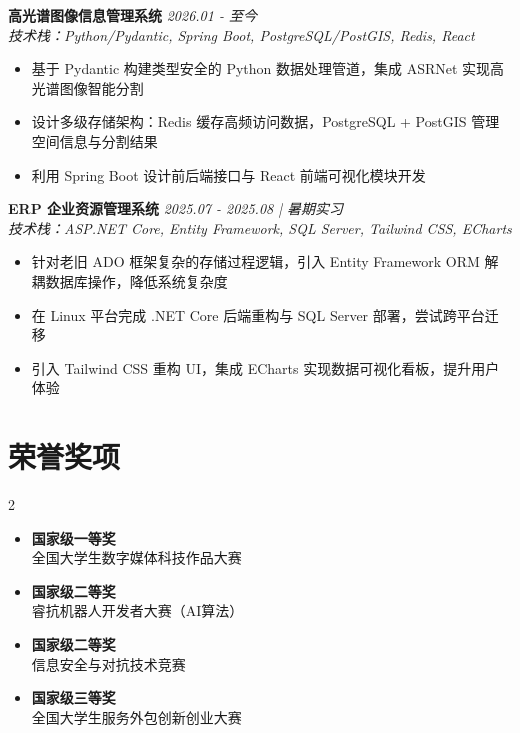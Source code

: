 \documentclass[11pt,a4paper]{article}
\newcommand{\resumeItem}[1]{\item\small{#1}}
\newcommand{\techstack}[1]{\textit{\small{\textcolor{secondary}{技术栈：#1}}}}
\newcommand{\projectdate}[1]{\hfill\textit{\small{\textcolor{secondary}{#1}}}}
\begin{document}
	\vspace{6pt}
	
	\textbf{高光谱图像信息管理系统} \projectdate{2026.01 - 至今} \\
	\techstack{Python/Pydantic, Spring Boot, PostgreSQL/PostGIS, Redis, React}
	\begin{itemize}[leftmargin=15pt, itemsep=2pt, topsep=4pt]
		\resumeItem{基于 Pydantic 构建类型安全的 Python 数据处理管道，集成 ASRNet 实现高光谱图像智能分割}
		\resumeItem{设计多级存储架构：Redis 缓存高频访问数据，PostgreSQL + PostGIS 管理空间信息与分割结果}
		\resumeItem{利用 Spring Boot 设计前后端接口与 React 前端可视化模块开发}
	\end{itemize}
	
	\vspace{6pt}
	
	\textbf{ERP 企业资源管理系统} \projectdate{2025.07 - 2025.08 | 暑期实习} \\
	\techstack{ASP.NET Core, Entity Framework, SQL Server, Tailwind CSS, ECharts}
	\begin{itemize}[leftmargin=15pt, itemsep=2pt, topsep=4pt]
		\resumeItem{针对老旧 ADO 框架复杂的存储过程逻辑，引入 Entity Framework ORM 解耦数据库操作，降低系统复杂度}
		\resumeItem{在 Linux 平台完成 .NET Core 后端重构与 SQL Server 部署，尝试跨平台迁移}
		\resumeItem{引入 Tailwind CSS 重构 UI，集成 ECharts 实现数据可视化看板，提升用户体验}
	\end{itemize}
	
	\section{荣誉奖项}
	
	\begin{multicols}{2}
		\begin{itemize}[leftmargin=15pt, itemsep=2pt, topsep=4pt]
			\item \textbf{国家级一等奖} \\ 全国大学生数字媒体科技作品大赛
			\item \textbf{国家级二等奖} \\ 睿抗机器人开发者大赛（AI算法）
			\item \textbf{国家级二等奖} \\ 信息安全与对抗技术竞赛
			\item \textbf{国家级三等奖} \\ 全国大学生服务外包创新创业大赛
		\end{itemize}
	\end{multicols}
	
\end{document}
